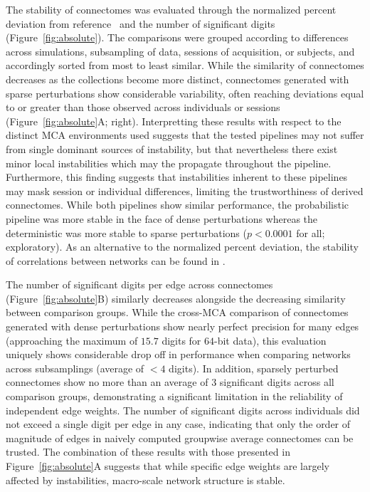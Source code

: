 \documentclass[fleqn,10pt]{SelfArx} %
\newcommand{\new}[1]{{#1}}
\begin{document}
The stability of connectomes was evaluated through the \new{normalized percent} deviation from reference~\cite{Kiar2020-lb} and the number
of significant digits
(Figure~\ref{fig:absolute}). The comparisons were grouped according to differences across simulations, subsampling
of data, sessions of acquisition, or subjects, \new{and accordingly sorted from most to least similar}. While the
similarity of connectomes decreases as the collections become
more distinct, connectomes generated with \new{sparse} perturbations show considerable variability, often reaching deviations
equal to or greater than those observed across individuals or sessions (Figure~\ref{fig:absolute}A; right).
\new{Interpretting these results with respect to the distinct MCA environments used suggests that the tested pipelines
may not suffer from single dominant sources of instability, but that nevertheless there exist minor local instabilities
which may the propagate throughout the pipeline. Furthermore,} this
finding suggests that instabilities inherent to these pipelines may mask session or individual differences, limiting
the trustworthiness of derived connectomes. While both pipelines show similar performance, the probabilistic pipeline
was more stable in the face of \new{dense} perturbations whereas the deterministic was more stable to \new{sparse} perturbations
($p < 0.0001$ for all; exploratory). \new{As an alternative to the normalized percent deviation, the stability of}
correlations \new{between} networks can be found in .

The number of significant digits per edge across connectomes (Figure~\ref{fig:absolute}B) similarly decreases
\new{alongside the decreasing similarity between comparison groups}. While the cross-MCA comparison of connectomes
generated with \new{dense} perturbations show nearly perfect
precision for many edges (approaching the maximum of $15.7$ digits for $64$-bit data), this evaluation uniquely shows
considerable drop off in performance \new{when comparing networks across} subsamplings (average of $< 4$ digits). In addition, \new{sparsely
perturbed connectomes} show no more than an average of $3$ significant digits across all \new{comparison} groups, demonstrating a significant
limitation in the reliability \new{of} independent edge weights. \new{The number of significant digits} across individuals did not exceed a single digit
per edge in any case, indicating that only the order \new{of} magnitude of edges in naively computed groupwise average connectomes can
be trusted. The combination of these results with those presented in Figure~\ref{fig:absolute}A suggests that while
specific edge weights are largely affected by instabilities, macro-scale network \new{structure} is stable.
\end{document}
